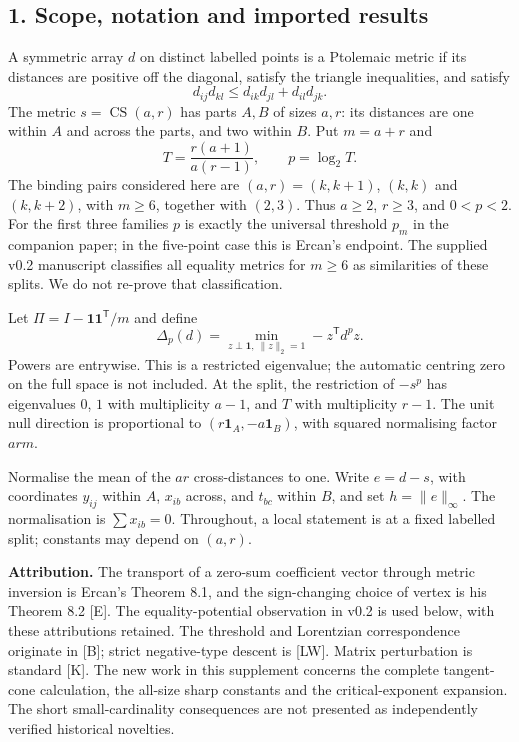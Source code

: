 \documentclass[11pt,a4paper]{article}
\begin{document}
\subsection{1. Scope, notation and imported
results}\label{scope-notation-and-imported-results}

A symmetric array \(d\) on distinct labelled points is a Ptolemaic
metric if its distances are positive off the diagonal, satisfy the
triangle inequalities, and satisfy
\[d_{ij}d_{kl}\le d_{ik}d_{jl}+d_{il}d_{jk}.\] The metric
\(s=\operatorname{CS}(a,r)\) has parts \(A,B\) of sizes \(a,r\): its
distances are one within \(A\) and across the parts, and two within
\(B\). Put \(m=a+r\) and \[T=\frac{r(a+1)}{a(r-1)},\qquad p=\log_2 T.\]
The binding pairs considered here are \((a,r)=(k,k+1)\), \((k,k)\) and
\((k,k+2)\), with \(m\ge6\), together with \((2,3)\). Thus \(a\ge2\),
\(r\ge3\), and \(0<p<2\). For the first three families \(p\) is exactly
the universal threshold \(p_m\) in the companion paper; in the
five-point case this is Ercan's endpoint. The supplied v0.2 manuscript
classifies all equality metrics for \(m\ge6\) as similarities of these
splits. We do not re-prove that classification.

Let \(\Pi=I-\mathbf1\mathbf1^{\mathsf T}/m\) and define
\[\Delta_p(d)=\min_{z\perp\mathbf1,\ \|z\|_2=1}-z^{\mathsf T}d^p z.\]
Powers are entrywise. This is a restricted eigenvalue; the automatic
centring zero on the full space is not included. At the split, the
restriction of \(-s^p\) has eigenvalues \(0\), \(1\) with multiplicity
\(a-1\), and \(T\) with multiplicity \(r-1\). The unit null direction is
proportional to \((r\mathbf1_A,-a\mathbf1_B)\), with squared normalising
factor \(arm\).

Normalise the mean of the \(ar\) cross-distances to one. Write
\(e=d-s\), with coordinates \(y_{ij}\) within \(A\), \(x_{ib}\) across,
and \(t_{bc}\) within \(B\), and set \(h=\|e\|_\infty\). The
normalisation is \(\sum x_{ib}=0\). Throughout, a local statement is at
a fixed labelled split; constants may depend on \((a,r)\).

\textbf{Attribution.} The transport of a zero-sum coefficient vector
through metric inversion is Ercan's Theorem 8.1, and the sign-changing
choice of vertex is his Theorem 8.2 {[}E{]}. The equality-potential
observation in v0.2 is used below, with these attributions retained. The
threshold and Lorentzian correspondence originate in {[}B{]}; strict
negative-type descent is {[}LW{]}. Matrix perturbation is standard
{[}K{]}. The new work in this supplement concerns the complete
tangent-cone calculation, the all-size sharp constants and the
critical-exponent expansion. The short small-cardinality consequences
are not presented as independently verified historical novelties.
\end{document}
